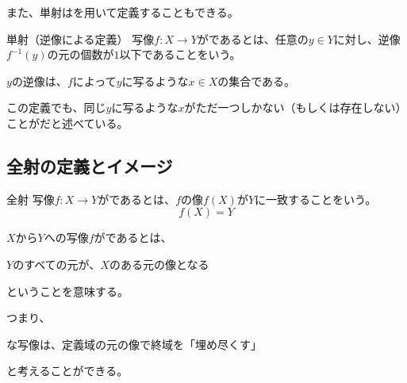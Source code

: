\documentclass[../../../topic_linear-algebra]{subfiles}
\begin{document}
\begin{center}
\end{center}

また、単射はを用いて定義することもできる。

\begin{definition*}{単射（逆像による定義）}
  写像$f\colon X \to Y$がであるとは、任意の$y \in Y$に対し、逆像$f^{-1}(y)$の元の個数が$1$以下であることをいう。
\end{definition*}

$y$の逆像は、$f$によって$y$に写るような$x \in X$の集合である。

この定義でも、同じ$y$に写るような$x$がただ一つしかない（もしくは存在しない）ことがだと述べている。

\subsection{全射の定義とイメージ}

\begin{definition*}{全射}
  写像$f\colon X \to Y$がであるとは、$f$の像$f(X)$が$Y$に一致することをいう。
  \begin{equation*}
    f(X) = Y
  \end{equation*}
\end{definition*}

$X$から$Y$への写像$f$がであるとは、
\begin{emphabox}
  \begin{spacebox}
    \begin{center}
      $Y$のすべての元が、$X$のある元の像となる
    \end{center}
  \end{spacebox}
\end{emphabox}
ということを意味する。

\br

つまり、
\begin{emphabox}
  \begin{spacebox}
    \begin{center}
      な写像は、定義域の元の像で終域を「埋め尽くす」
    \end{center}
  \end{spacebox}
\end{emphabox}
と考えることができる。
\end{document}
